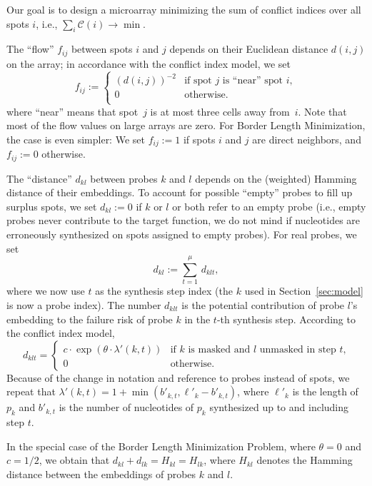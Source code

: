 \documentclass[english]{lni}
\begin{document}
Our goal is to design a microarray minimizing the sum of conflict indices over
all spots $i$, i.e., $\sum_{i} \mathcal{C}(i) \to \min$.

The ``flow'' $f_{ij}$ between spots $i$ and $j$ depends on their Euclidean distance
$d(i,j)$ on the array; in accordance with the conflict index model, we set
\begin{equation}
  f_{ij} := \left\{ \begin{array}{ll}
      (d(i,j))^{-2} & \mbox{if spot $j$ is ``near'' spot $i$}, \\
      0 & \mbox{otherwise}. \\
    \end{array} \right.
\end{equation}
where ``near'' means that spot~$j$ is at most three cells away from~$i$. Note
that most of the flow values on large arrays are zero. For Border Length
Minimization, the case is even simpler: We set $f_{ij}:=1$ if spots $i$ and
$j$ are direct neighbors, and $f_{ij}:=0$ otherwise.

The ``distance'' $d_{kl}$ between probes $k$ and $l$ depends on the (weighted) Hamming
distance of their embeddings. To account for possible ``empty'' probes to fill
up surplus spots, we set $d_{kl}:=0$ if $k$ or $l$ or both refer to an empty
probe (i.e., empty probes never contribute to the target function, we do not
mind if nucleotides are erroneously synthesized on spots assigned to empty
probes). For real probes, we set
\[ d_{kl} := \sum_{t=1}^\mu\, d_{klt}, \]
where we now use $t$ as the synthesis step index (the $k$ used in
Section~\ref{sec:model} is now a probe index). The number $d_{klt}$ is the
potential contribution of probe $l$'s embedding to the failure risk of probe
$k$ in the $t$-th synthesis step. According to the conflict index model,
\[ d_{klt}  = \left\{ \begin{array}{ll}
    c \cdot \exp(\theta \cdot \lambda'(k,t)) 
    & \mbox{if $k$ is masked and $l$ unmasked in step $t$,}\\
    0
    & \mbox{otherwise.}
  \end{array} \right.
\]
Because of the change in notation and reference to probes instead of spots, we
repeat that $\lambda'(k,t) = 1 + \min(b'_{k,t},\ell'_{k} - b'_{k,t})$, where
$\ell'_{k}$ is the length of $p_k$ and $b'_{k,t}$ is the number of nucleotides
of $p_k$ synthesized up to and including step $t$.

In the special case of the Border Length Minimization Problem, where
$\theta=0$ and $c=1/2$, we obtain that $d_{kl} + d_{lk} = H_{kl} = H_{lk}$,
where $H_{kl}$ denotes the  Hamming distance between the embeddings of probes
$k$ and $l$.
\end{document}
